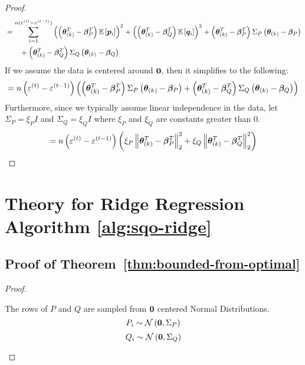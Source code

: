 \documentclass{article} %
\newcommand{\norm}[1]{\left\lVert#1\right\rVert}
\begin{document}
\begin{appendices}
\begin{proof}
\begin{align*}
		&= \sum_{i=1}^{n(\varepsilon^{(t)} - \varepsilon^{(t-1)})} \left(\left({\bm{\theta}}_{(k)}^T - {\bm{\beta}}_P^T\right)\mathbb{E}\left[{\bm{p}}_i\right]\right)^2 + \left(\left({\bm{\theta}}_{(k)}^T - {\bm{\beta}}_Q^T\right)\mathbb{E}\left[{\bm{q}}_i\right]\right)^2 + \left({\bm{\theta}}_{(k)}^T - {\bm{\beta}}_P^T\right)\Sigma_P\left({\bm{\theta}}_{(k)} - {\bm{\beta}}_P\right) \notag\\ &\qquad+ \left({\bm{\theta}}_{(k)}^T - {\bm{\beta}}_Q^T\right)\Sigma_Q\left({\bm{\theta}}_{(k)} - {\bm{\beta}}_Q\right)
	\end{align*}
	If we assume the data is centered around ${\bm{0}}$, then it simplifies to the following:
	\begin{equation}
		= n\left(\varepsilon^{(t)} - \varepsilon^{(t-1)}\right) \left(\left({\bm{\theta}}_{(k)}^T - {\bm{\beta}}_P^T\right)\Sigma_P\left({\bm{\theta}}_{(k)} - {\bm{\beta}}_P\right) + \left({\bm{\theta}}_{(k)}^T - {\bm{\beta}}_Q^T\right)\Sigma_Q\left({\bm{\theta}}_{(k)} - {\bm{\beta}}_Q\right)\right)
	\end{equation}
	Furthermore, since we typically assume linear independence in the data, let $\Sigma_P = \xi_P I$ and $\Sigma_Q = \xi_Q I$ where $\xi_P$ and $\xi_Q$ are constants greater than $0$.
	\begin{equation}
		= n\left(\varepsilon^{(t)} - \varepsilon^{(t-1)}\right) \left(\xi_P\norm{\vtheta_{(k)}^T - \vbeta_P^T}^2_2 + \xi_Q\norm{\vtheta_{(k)}^T - \vbeta_Q^T}^2_2\right)
	\end{equation}
	\end{proof}
	\newpage
	
	\section{Theory for Ridge Regression Algorithm \ref{alg:sqo-ridge}}\label{app:Subquantile-optimization}
	\subsection{Proof of Theorem~\ref{thm:bounded-from-optimal}}\label{app:expected-value-corrupted}
	\begin{proof}
		\begin{assumption}\label{asm:normal-sampling}
			The rows of $P$ and $Q$ are sampled from ${\bm{0}}$ centered Normal Distributions.
			\begin{equation*}
				P_i \sim \mathcal{N}\left({\bm{0}}, \Sigma_P\right)
			\end{equation*}
			\begin{equation}
				Q_i \sim \mathcal{N}\left({\bm{0}}, \Sigma_Q\right)
			\end{equation}
		\end{assumption}
		

\end{proof}
\end{appendices}
\end{document}
